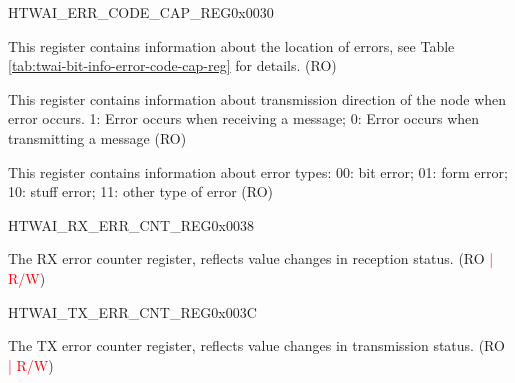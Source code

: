 \begin{register}{H}{TWAI\_ERR\_CODE\_CAP\_REG}{0x0030}\label{regdesc:TWAIERRCODECAPREG}
%
%
%
%
\regnewline%
\begin{regdesc}\begin{reglist}
\label{fielddesc:TWAIECCSEGMENT}\item [TWAI\_ECC\_SEGMENT] This register contains information about the location of errors, see Table \ref{tab:twai-bit-info-error-code-cap-reg} for details. (RO)
\label{fielddesc:TWAIECCDIRECTION}\item [TWAI\_ECC\_DIRECTION] This register contains information about transmission direction of the node when error occurs. 1: Error occurs when receiving a message; 0: Error occurs when transmitting a message (RO)
\label{fielddesc:TWAIECCTYPE}\item [TWAI\_ECC\_TYPE] This register contains information about error types:
00: bit error; 01: form error; 10: stuff error; 11: other type of error (RO)
\end{reglist}\end{regdesc}
\end{register}

\begin{register}{H}{TWAI\_RX\_ERR\_CNT\_REG}{0x0038}\label{regdesc:TWAIRXERRCNTREG}
%
%
\regnewline%
\begin{regdesc}\begin{reglist}
\label{fielddesc:TWAIRXERRCNT}\item [TWAI\_RX\_ERR\_CNT] The RX error counter register, reflects value changes in reception status. (RO \textcolor{red}{| R/W})
\end{reglist}\end{regdesc}
\end{register}


\begin{register}{H}{TWAI\_TX\_ERR\_CNT\_REG}{0x003C}\label{regdesc:TWAITXERRCNTREG}
%
%
\regnewline%
\begin{regdesc}\begin{reglist}
\label{fielddesc:TWAITXERRCNT}\item [TWAI\_TX\_ERR\_CNT] The TX error counter register, reflects value changes in transmission status. (RO \textcolor{red}{| R/W})
\end{reglist}\end{regdesc}
\end{register}


